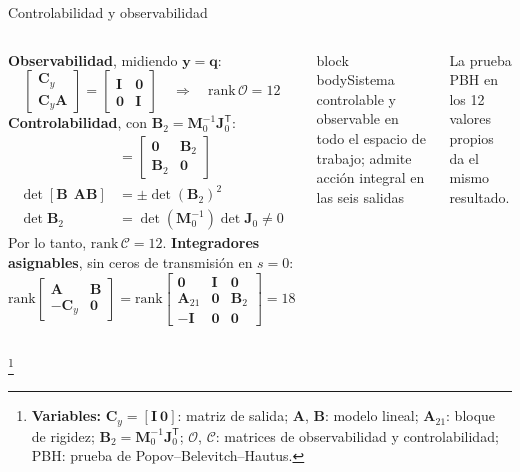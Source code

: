 \documentclass[aspectratio=169,10pt]{beamer}
\newcommand{\vect}[1]{\bm{#1}}
\newcommand{\T}{^{\mathsf{T}}}
\newcommand{\variables}[1]{\begingroup\renewcommand{\thefootnote}{}\footnote[frame]{\textbf{Variables:} #1}\addtocounter{footnote}{-1}\endgroup}
\newcommand{\resultado}[1]{\par\smallskip\begin{beamercolorbox}[rounded=true,sep=0.45em,center]{block body}#1\end{beamercolorbox}\par\smallskip}
\begin{document}
\begin{frame}{Controlabilidad y observabilidad}
\small
\begin{columns}[T]
\textbf{Observabilidad}, midiendo $\vect y = \vect q$:
\[
\begin{bmatrix}\vect C_y\\ \vect C_y\vect A\end{bmatrix} = \begin{bmatrix}\vect I & \vect 0\\ \vect 0 & \vect I\end{bmatrix}\quad\Rightarrow\quad \mathrm{rank}\,\mathcal O = 12
\]
\textbf{Controlabilidad}, con $\vect B_2 = \vect M_0^{-1}\vect J_0\T$:
\begin{align*}
[\vect B\ \ \vect A\vect B] &= \begin{bmatrix}\vect 0 & \vect B_2\\ \vect B_2 & \vect 0\end{bmatrix}\\
\det[\vect B\ \ \vect A\vect B] &= \pm\det(\vect B_2)^2\\
\det\vect B_2 &= \det(\vect M_0^{-1})\det\vect J_0 \neq 0
\end{align*}
Por lo tanto, $\mathrm{rank}\,\mathcal C = 12$.
\textbf{Integradores asignables}, sin ceros de transmisión en $s = 0$:
\[
\mathrm{rank}\begin{bmatrix}\vect A & \vect B\\ -\vect C_y & \vect 0\end{bmatrix} = \mathrm{rank}\begin{bmatrix}\vect 0 & \vect I & \vect 0\\ \vect A_{21} & \vect 0 & \vect B_2\\ -\vect I & \vect 0 & \vect 0\end{bmatrix} = 18
\]
\resultado{Sistema controlable y observable en todo el espacio de trabajo; admite acción integral en las seis salidas}
La prueba PBH en los 12 valores propios da el mismo resultado.
\end{columns}
\variables{$\vect C_y = [\vect I\ \vect 0]$: matriz de salida; $\vect A$, $\vect B$: modelo lineal; $\vect A_{21}$: bloque de rigidez; $\vect B_2 = \vect M_0^{-1}\vect J_0\T$; $\mathcal O$, $\mathcal C$: matrices de observabilidad y controlabilidad; PBH: prueba de Popov--Belevitch--Hautus.}
\end{frame}

\end{document}
